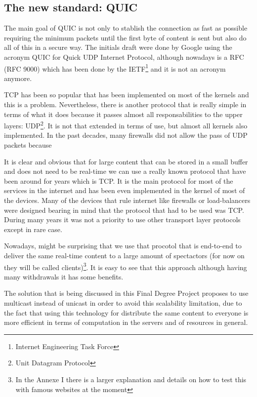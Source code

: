 \subsection{The new standard: QUIC}
{
    The main goal of QUIC is not only to stablish the connection as fast as possible requiring the minimum packets until the first byte of content is sent but 
    also do all of this in a secure way. The initials draft were done by Google using the acronym QUIC for Quick UDP Internet Protocol, although nowadays is a RFC (RFC 9000) which
    has been done by the IETF\footnote{Internet Engineering Task Force} and it is not an acronym anymore.

    TCP has been so popular that has been implemented on most of the kernels and this is a problem. Nevertheless, there is another protocol that is really simple in terms of what
    it does because it passes almost all responsabilities to the upper layers: UDP\footnote{Unit Datagram Protocol}. It is not that extended in terms of use, but almost all kernels
    also implemented. In the past decades, many firewalls did not allow the pass of UDP packets because 




    It is clear and obvious that for large content that can be stored in a small buffer and does not need to be real-time we can use a really known 
    protocol that have been around for years which is TCP. It is the main protocol for most of the services in the internet and has been even implemented
    in the kernel of most of the devices. Many of the devices that rule internet like firewalls or load-balancers were designed bearing in mind that the
    protocol that had to be used was TCP. During many years it was not a priority to use other transport layer protocols except in rare case.

    Nowadays, might be surprising that we use that procotol that is end-to-end to deliver the same real-time content to a large amount of spectactors (for
    now on they will be called clients)\footnote{In the Annexe I there is a larger explanation and details on how to test this with famous websites at the
    moment}. It is easy to see that this approach although having many withdrawals it has some benefits.

    The solution that is being discussed in this Final Degree Project proposes to use multicast instead of unicast in order to avoid this scalability limitation, due to
    the fact that using this technology for distribute the same content to everyone is more efficient in terms of computation in the servers and of resources in general.
}

